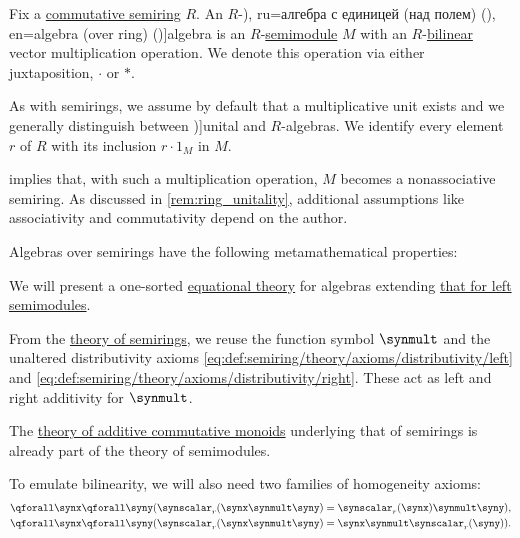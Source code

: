 \begin{definition}\label{def:algebra_over_semiring}\mimprovised
  Fix a \hyperref[def:semiring/commutative]{commutative semiring} \( R \). An \( R \)-\term[bg=линейна асоциативна алгебра (над поле) (\cite[298]{ГеновМиховскиМоллов1991Алгебра}), ru=алгебра с единицей (над полем) (\cite[def. 1.7.1]{Винберг2014КурсАлгебры}), en=algebra (over ring) (\cite[def. 3.1.1]{Bourbaki1998Algebra1to3})]{algebra} is an \( R \)-\hyperref[def:semimodule]{semimodule} \( M \) with an \( R \)-\hyperref[def:multilinear_function]{bilinear} vector multiplication operation. We denote this operation via either juxtaposition, \( {\cdot} \) or \( {\ast} \).

  As with semirings, we assume by default that a multiplicative unit exists and we generally distinguish between \term[en=unital algebra (over ring) (\cite[428]{Bourbaki1998Algebra1to3})]{unital} and  \( R \)-algebras. We identify every element \( r \) of \( R \) with its inclusion \( r \cdot 1_M \) in \( M \).

   implies that, with such a multiplication operation, \( M \) becomes a nonassociative semiring. As discussed in \cref{rem:ring_unitality}, additional assumptions like associativity and commutativity depend on the author.

  Algebras over semirings have the following metamathematical properties:
  \begin{thmenum}
     We will present a one-sorted \hyperref[def:fol_equational_theory]{equational theory} for algebras extending \hyperref[def:semimodule/theory]{that for left semimodules}.

    From the \hyperref[def:semiring/theory]{theory of semirings}, we reuse the function symbol \( {\synmult} \) and the unaltered distributivity axioms \eqref{eq:def:semiring/theory/axioms/distributivity/left} and \eqref{eq:def:semiring/theory/axioms/distributivity/right}. These act as left and right additivity for \( {\synmult} \).

    The \hyperref[def:additive_semigroup/theory]{theory of additive commutative monoids} underlying that of semirings is already part of the theory of semimodules.

    To emulate bilinearity, we will also need two families of homogeneity axioms:
    \begin{align}
      \qforall \synx \qforall \syny (\synscalar_r(\synx \synmult \syny) &= \synscalar_r(\synx) \synmult \syny), \label{eq:def:algebra_over_semiring/theory/homogeneity/left} \\
      \qforall \synx \qforall \syny (\synscalar_r(\synx \synmult \syny) &= \synx \synmult \synscalar_r(\syny)). \label{eq:def:algebra_over_semiring/theory/homogeneity/right}
    \end{align}


\end{thmenum}
\end{definition}
